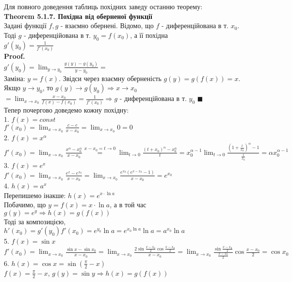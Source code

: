 \documentclass[a4paper, 14pt]{extarticle}
\def\huge{\displaystyle}
\def\bigline{\vspace{5mm}\\}
\def\th#1{\textbf{Theorem {#1}}}
\def\proof{\textbf{Proof.}\\}
\def\bigline{\vspace{5mm}\\}
\def\qed{$\blacksquare$}
\begin{document}
Для повного доведення таблиць похідних заведу останню теорему:\\
\th{5.1.7. Похідна від оберненої функції}\\
Задані функції $f,g$ - взаємно обернені. Відомо, що $f$ - диференційована в т. $x_0$. Тоді $g$ - диференційована в т. $y_0 = f(x_0)$, а її похідна\\
$g'(y_0) = \huge \frac{1}{f'(x_0)}$\\
\proof
$g'(y_0) = \huge \lim_{y \to y_0} \frac{g(y)-g(y_0)}{y-y_0} =$\\
Заміна: $y = f(x)$. Звідси через взаємну оберненість $g(y)=g(f(x))=x$. Якщо $y \to y_0$, то $g(y) \to g(y_0) \Rightarrow x \to x_0$\\
$= \huge \lim_{x \to x_0}\frac{x-x_0}{f(x)-f(x_0)} = \frac{1}{f'(x_0)} \Rightarrow g$ - диференційована в т. $y_0$ \qed
\bigline
Тепер почергово доведемо кожну похідну:\\
1. $f(x) = const$\\
$f'(x_0) = \huge \lim_{x \to x_0} \frac{c-c}{x-x_0} = \lim_{x \to x_0} 0 = 0$
\bigline
2. $f(x) = x^{\alpha}$\\
$f'(x_0) = \huge \lim_{x \to x_0} \frac{x^{\alpha} - x_0^{\alpha}}{x-x_0} \overset{x-x_0 = t \to 0}{=} \lim_{t \to 0} \frac{(t+x_0)^{\alpha} - x_0^{\alpha}}{t} = x_0^{\alpha-1} \lim_{t \to 0} \frac{\left(1 + \frac{t}{x_0}\right)^{\alpha} - 1}{\frac{t}{x_0}} = \alpha x_0^{\alpha-1}$
\bigline
3. $f(x) = e^x$\\
$f'(x_0) = \huge \lim_{x \to x_0} \frac{e^x-e^{x_0}}{x-x_0} = \lim_{x \to x_0} \frac{e^{x_0}(e^{x-x_0}-1)}{x-x_0} = e^{x_0}$
\bigline
4. $h(x) = a^x$\\
Перепишемо інакше: $h(x) = e^{x \cdot \ln a}$\\
Побачимо, що $y = f(x) = x \cdot \ln a$, а в той час $g(y) = e^y \Rightarrow h(x)=g(f(x))$\\
Тоді за композицією, \\ $h'(x_0) = g'(y_0) f'(x_0) = e^{y_0} \ln a = e^{x_0 \ln a} \ln a = a^{x_0} \ln a$
\bigline
5. $f(x) = \sin x$\\
$f'(x_0) = \huge \lim_{x \to x_0} \frac{\sin x - \sin x_0}{x-x_0} = \lim_{x \to x_0} \frac{2 \sin \frac{x-x_0}{2} \cos \frac{x-x_0}{2}}{x-x_0} = \lim_{x \to x_0} \frac{\sin \frac{x-x_0}{2}}{\frac{x-x_0}{2}} \cos \frac{x-x_0}{2} = \cos x_0$
\bigline
6. $h(x) = \huge \cos x = \sin \left(\frac{\pi}{2} - x \right)$\\
$f(x) = \huge \frac{\pi}{2} - x$, $g(y) = \sin y \Rightarrow h(x) = g(f(x))$\\
\end{document}

